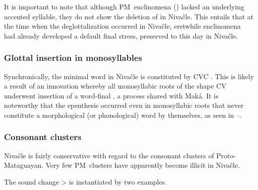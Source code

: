 It is important to note that although PM~enclinomena () lacked an underlying accented syllable, they do not show the deletion of  in Nivaĉle. This entails that at the time when the deglottalization occurred in Nivaĉle, erstwhile enclinomena had already developed a default final stress, preserved to this day in Nivaĉle.

\begin{exe}
    \ex \coalabssg
    \ex \jaguar
    \ex \treensg
    \ex \vulturesg
    \ex \takeaway
    \ex \tailsg
    \ex \withstand
    \ex \petsg
    \ex \languagewordsg
    \ex \yicalhuksg
    \ex \smelln
    \ex \fence
    \ex \lid
    \ex \starnsg
    \ex \vein
    \ex \shoot
    \ex \carrysh
    \ex \bromelia
    \ex \walk
    \ex \placen
    \ex \pricesg
    \ex \earthsg
    \ex \nightnwsg
    \ex \firewoodhuksg
    \ex \meatitssg
\end{exe}

\subsubsection{Glottal insertion in monosyllables}\label{ni-glottal-insertion}

Synchronically, the minimal word in Nivaĉle is constituted by CVC \citep[118, 132ff.]{AnG15}. This is likely a result of an innovation whereby all monosyllabic roots of the shape CV underwent insertion of a word-final , a process shared with Maká. It is noteworthy that the epenthesis occurred even in monosyllabic roots that never constitute a morphological (or phonological) word by themselves, as seen in --.

\begin{exe}
    \ex \thorne
    \ex \tooln \label{ni-glott-ep-tool}
    \ex \sleep \label{ni-glott-ep-sleep}
    \ex \penis
    \ex \worm
    \ex \belly
    \ex \price
    \ex \juice
\end{exe}

\subsubsection{Consonant clusters}\label{ni-clusters}

Nivaĉle is fairly conservative with regard to the consonant clusters of Proto-Mataguayan. Very few PM~clusters have apparently become illicit in Nivaĉle.

The sound change  >  is instantiated by two examples.

